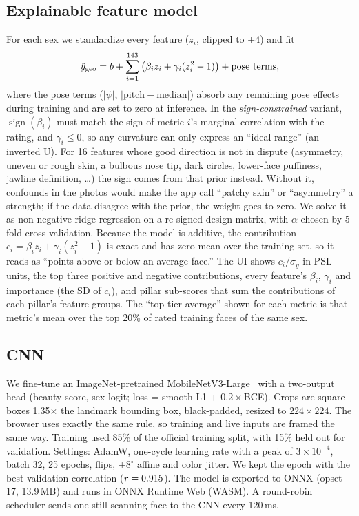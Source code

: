 \documentclass[sigconf,nonacm]{acmart}
\begin{document}
\subsection{Explainable feature model}
\label{sec:geo}
For each sex we standardize every feature ($z_i$, clipped to $\pm4$) and fit
\[
\hat y_{\text{geo}} = b + \sum_{i=1}^{143}\big(\beta_i z_i + \gamma_i (z_i^2-1)\big) + \text{pose terms},
\]
where the pose terms ($|\psi|$, $|\text{pitch}-\text{median}|$) absorb any remaining pose effects during training and are
set to zero at inference. In the \emph{sign-constrained} variant, $\operatorname{sign}(\beta_i)$ must match
the sign of metric $i$'s marginal correlation with the rating, and $\gamma_i\le0$, so any curvature can only
express an ``ideal range'' (an inverted U). For 16 features whose good direction is not in dispute
(asymmetry, uneven or rough skin, a bulbous nose tip, dark circles, lower-face puffiness, jawline definition,
\dots) the sign comes from that prior instead. Without it, confounds in the photos would make the app call
``patchy skin'' or ``asymmetry'' a strength; if the data disagree with the prior, the weight goes to zero. We solve it as non-negative ridge regression on a re-signed
design matrix, with $\alpha$ chosen by 5-fold cross-validation. Because the model is additive, the contribution
$c_i=\beta_i z_i+\gamma_i(z_i^2-1)$ is exact and has zero mean over the training set, so it reads as
``points above or below an average face.'' The UI shows $c_i/\sigma_y$ in PSL units, the top three
positive and negative contributions, every feature's $\beta_i$, $\gamma_i$ and importance (the SD of $c_i$),
and pillar sub-scores that sum the contributions of each pillar's feature groups. The ``top-tier average'' shown for each metric is that metric's mean
over the top 20\% of rated training faces of the same sex.

\subsection{CNN}
We fine-tune an ImageNet-pretrained MobileNetV3-Large~\cite{howard2019mobilenetv3} with a two-output
head (beauty score, sex logit; loss = smooth-L1 + $0.2\times$BCE). Crops are square boxes 1.35$\times$ the
landmark bounding box, black-padded, resized to $224{\times}224$. The browser uses exactly the same rule, so
training and live inputs are framed the same way. Training used 85\% of the official training split, with
15\% held out for validation. Settings: AdamW, one-cycle learning rate with a peak of $3{\times}10^{-4}$, batch 32,
25 epochs, flips, $\pm8^\circ$ affine and color jitter. We kept the epoch with the best validation correlation
($r=0.915$). The model is exported to ONNX (opset 17, 13.9\,MB) and runs in ONNX Runtime Web (WASM).
A round-robin scheduler sends one still-scanning face to the CNN every 120\,ms.
\end{document}
